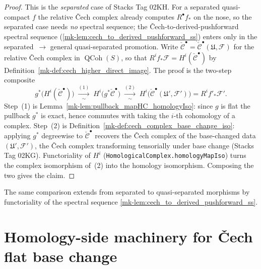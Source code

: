 \begin{proof}
  This is the \emph{separated} case of Stacks Tag 02KH. For a separated quasi-compact
  \(f\) the relative {\v C}ech complex already computes \(R^\bullet f_*\) on the nose,
  so the separated case needs \emph{no} spectral sequence; the
  {\v C}ech-to-derived-pushforward spectral sequence
  (\ref{mk-lem:cech_to_derived_pushforward_ss}) enters only in the
  separated~\(\to\) general quasi-separated promotion. Write
  \(\check{\mathcal{C}}^\bullet = \check{\mathcal{C}}^\bullet(\mathfrak{U},\mathcal{F})\)
  for the relative {\v C}ech complex in \(\operatorname{QCoh}(S)\), so that
  \(R^i f_*\mathcal{F} = H^i(\check{\mathcal{C}}^\bullet)\) by
  Definition~\ref{mk-def:cech_higher_direct_image}. The proof is the two-step composite
  \[
    g^*\bigl(H^i(\check{\mathcal{C}}^\bullet)\bigr)
      \;\xrightarrow[\ \sim\ ]{(1)}\;
    H^i\bigl(g^*\check{\mathcal{C}}^\bullet\bigr)
      \;\xrightarrow[\ \sim\ ]{(2)}\;
    H^i\bigl(\check{\mathcal{C}}^\bullet(\mathfrak{U}', \mathcal{F}')\bigr)
      = R^i f'_*\mathcal{F}'.
  \]
  Step~(1) is Lemma~\ref{mk-lem:pullback_mapHC_homologyIso}: since \(g\) is flat the
  pullback \(g^*\) is exact, hence commutes with taking the \(i\)-th cohomology of a
  complex. Step~(2) is Definition~\ref{mk-def:cech_complex_base_change_iso}: applying
  \(g^*\) degreewise to \(\check{\mathcal{C}}^\bullet\) recovers the {\v C}ech complex
  of the base-changed data \((\mathfrak{U}', \mathcal{F}')\), the {\v C}ech complex
  transforming tensorially under base change (Stacks Tag 02KG). Functoriality of
  \(H^i\) (\texttt{HomologicalComplex.homologyMapIso}) turns the complex isomorphism
  of~(2) into the homology isomorphism. Composing the two gives the claim.
\end{proof}

\begin{remark}
  \label{mk-rem:cech_flat_base_change_general}
  The same comparison extends from separated to quasi-separated morphisms by
  functoriality of the spectral sequence \ref{mk-lem:cech_to_derived_pushforward_ss}.
\end{remark}

\section{Homology-side machinery for {\v C}ech flat base change}

